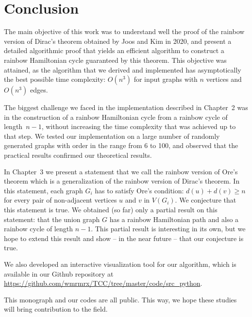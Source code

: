 
\chapter{Conclusion}   %

The main objective of this work was to understand well the proof of
the rainbow version of Dirac's theorem obtained by Joos and Kim in
2020, and present a detailed algorithmic proof that yields an
efficient algorithm to construct a rainbow Hamiltonian cycle
guaranteed by this theorem.  This objective was attained, as the
algorithm that we derived and implemented has asymptotically the best
possible time complexity: $O(n^3)$ for input graphs with $n$ vertices
and $O(n^3)$ edges.

The biggest challenge we faced in the implementation described in
Chapter~2 was in the construction of a rainbow Hamiltonian cycle from
a rainbow cycle of length~$n-1$, without increasing the time
complexity that was achieved up to that step.  We tested our
implementation on a large number of randomly generated graphs with
order in the range from 6 to 100, and observed that the practical
results confirmed our theoretical results.

In Chapter~3 we present a statement that we call the rainbow version
of Ore's theorem which is a generalization of the rainbow version of
Dirac's theorem. In this statement, each graph $G_i$ has to satisfy
Ore's condition: $d(u) + d(v) \geq n$ for every pair of
non-adjacent vertices $u$ and $v$ in $V(G_i)$.  We conjecture that
this statement is true. We obtained (so far) only a partial result on
this statement: that the union graph $G$ has a rainbow Hamiltonian
path and also a rainbow cycle of length $n-1$. This partial result is
interesting in its own, but we hope to extend this result and 
show -- in the near future -- that our conjecture is true.

We also developed an interactive visualization tool for our algorithm,
which is available in our Github repository at
\url{https://github.com/wmrmrx/TCC/tree/master/code/src_python}.

This monograph and our codes are all public. This way, we hope these
studies will bring contribution to the field.



